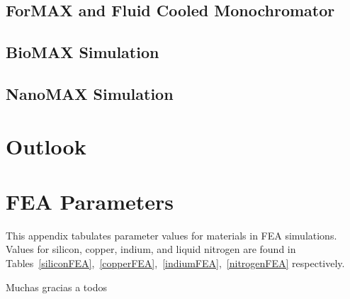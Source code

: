 \documentclass[preprint]{iucr}              %
\begin{document}
\subsection{ForMAX and Fluid Cooled Monochromator}\label{formax}
\subsection{BioMAX Simulation}\label{biomax}
\subsection{NanoMAX Simulation}\label{nanomax}

\section{Outlook}


\appendix

\section{FEA Parameters}\label{feaparameters}

This appendix tabulates parameter values for materials in FEA simulations. Values for silicon, copper, indium, and liquid nitrogen are found in Tables~\ref{siliconFEA},~\ref{copperFEA},~\ref{indiumFEA},~\ref{nitrogenFEA} respectively.
\vspace{1.5cm}







Muchas gracias a todos


\end{document}

